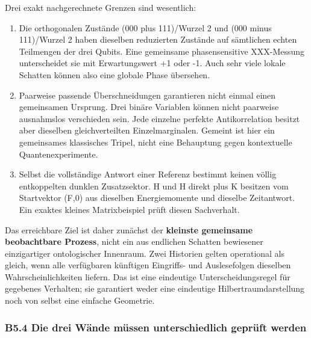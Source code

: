 Drei exakt nachgerechnete Grenzen sind wesentlich:

\begin{enumerate}
\def\labelenumi{\arabic{enumi}.}
\tightlist
\item
  Die orthogonalen Zustände (000 plus 111)/Wurzel 2 und (000 minus
  111)/Wurzel 2 haben dieselben reduzierten Zustände auf sämtlichen
  echten Teilmengen der drei Qubits. Eine gemeinsame phasensensitive
  XXX-Messung unterscheidet sie mit Erwartungswert +1 oder -1. Auch sehr
  viele lokale Schatten können also eine globale Phase übersehen.
\item
  Paarweise passende Überschneidungen garantieren nicht einmal einen
  gemeinsamen Ursprung. Drei binäre Variablen können nicht paarweise
  ausnahmslos verschieden sein. Jede einzelne perfekte Antikorrelation
  besitzt aber dieselben gleichverteilten Einzelmarginalen. Gemeint ist
  hier ein gemeinsames klassisches Tripel, nicht eine Behauptung gegen
  kontextuelle Quantenexperimente.
\item
  Selbst die vollständige Antwort einer Referenz bestimmt keinen völlig
  entkoppelten dunklen Zusatzsektor. H und H direkt plus K besitzen vom
  Startvektor (F,0) aus dieselben Energiemomente und dieselbe
  Zeitantwort. Ein exaktes kleines Matrixbeispiel prüft diesen
  Sachverhalt.
\end{enumerate}

Das erreichbare Ziel ist daher zunächst der \textbf{kleinste gemeinsame
beobachtbare Prozess}, nicht ein aus endlichen Schatten bewiesener
einzigartiger ontologischer Innenraum. Zwei Historien gelten operational
als gleich, wenn alle verfügbaren künftigen Eingriffs- und Auslesefolgen
dieselben Wahrscheinlichkeiten liefern. Das ist eine eindeutige
Unterscheidungsregel für gegebenes Verhalten; sie garantiert weder eine
eindeutige Hilbertraumdarstellung noch von selbst eine einfache
Geometrie.

\subsubsection{B5.4 Die drei Wände müssen unterschiedlich geprüft
werden}\label{b5.4-die-drei-wuxe4nde-muxfcssen-unterschiedlich-gepruxfcft-werden}

